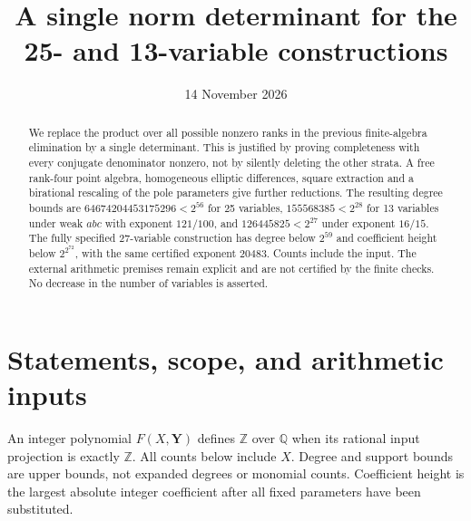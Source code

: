 \documentclass[11pt,a4paper]{article}
\title{A single norm determinant for the 25- and 13-variable constructions}
\author{}\date{14 November 2026}
\theoremstyle{remark}\newtheorem{remark}[theorem]{Remark}
\newcommand{\Q}{\mathbb Q}\newcommand{\Z}{\mathbb Z}\newcommand{\C}{\mathbb C}
\begin{document}
\maketitle
\begin{abstract}
We replace the product over all possible nonzero ranks in the previous
finite-algebra elimination by a single determinant. This is justified by
proving completeness with every conjugate denominator nonzero, not by
silently deleting the other strata. A free rank-four point algebra,
homogeneous elliptic differences, square extraction and a birational
rescaling of the pole parameters give further reductions. The resulting
degree bounds are $64674204453175296<2^{56}$ for 25 variables,
$155568385<2^{28}$ for 13 variables under weak $abc$ with exponent
$121/100$, and $126445825<2^{27}$ under exponent $16/15$.
The fully specified 27-variable construction has degree below $2^{59}$
and coefficient height below $2^{2^{72}}$, with the same certified
exponent $20483$. Counts include the input. The external arithmetic
premises remain explicit and are not certified by the finite checks.
No decrease in the number of variables is asserted.
\end{abstract}

\section{Statements, scope, and arithmetic inputs}
An integer polynomial $F(X,\boldsymbol Y)$ defines $\Z$ over $\Q$ when
its rational input projection is exactly $\Z$. All counts below include $X$.
Degree and support bounds are upper bounds, not expanded degrees or
monomial counts. Coefficient height is the largest absolute integer
coefficient after all fixed parameters have been substituted.
\end{document}
